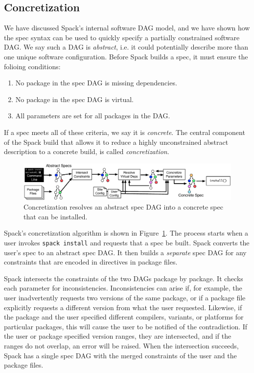 
\subsection{Concretization}

We have discussed Spack's internal software DAG model, and we have shown
how the spec syntax can be used to quickly specify a partially constrained
software DAG.  We say such a DAG is {\it abstract}, i.e. it could potentially describe
more than one unique software configuration. Before Spack builds a spec, it
must ensure the folioing conditions:
\begin{enumerate}
\item No package in the spec DAG is missing dependencies.
\item No package in the spec DAG is virtual.
\item All parameters are set for all packages in the DAG.
\end{enumerate}
If a spec meets all of these criteria, we say it is {\it concrete}.
The central component of the Spack build that allows it to reduce a 
highly unconstrained abstract description to a concrete build, is
called {\it concretization}.

\begin{figure}
	\centering
	\includegraphics[width=\textwidth]{figs/concretization.pdf}
	\caption{
		Concretization resolves an abstract spec DAG into a concrete spec that can be installed.
		\label{fig:concretization}
	}
\end{figure}

Spack's concretization algorithm is shown in Figure~\ref{fig:concretization}.
The process starts when a user invokes {\tt spack install} and requests that
a spec be built.  Spack converts the user's spec to an abstract spec DAG.
It then builds a {\it separate} spec DAG for any constraints that are encoded
in directives in package files. 

Spack intersects the constraints of the two DAGs package by package.  It checks
each parameter for inconsistencies.  Inconsistencies can arise if, for example,
the user inadvertently requests two versions of the same package, or if a
package file explicitly requests a different version from what the user requested.
Likewise, if the package and the user specified different compilers, variants,
or platforms for particular packages, this will cause the user to be notified
of the contradiction. If the user or package specified version ranges, they are
intersected, and if the ranges do not overlap, an error will be raised.
When the intersection succeeds, Spack has a single spec DAG with the merged
constraints of the user and the package files.  

